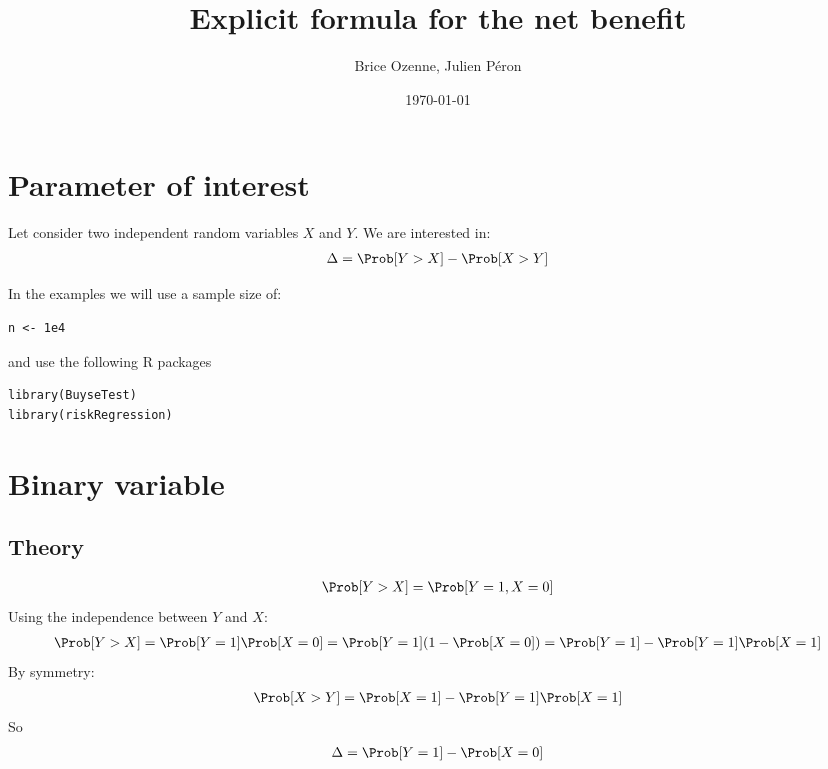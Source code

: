 \documentclass{article}
\author{Brice Ozenne, Julien Péron}
\date{\today}
\title{Explicit formula for the net benefit}
\begin{document}
\maketitle
\tableofcontents

\clearpage

\section{Parameter of interest}
\label{sec:org3ea6593}

Let consider two independent random variables \(X\) and \(Y\).
We are interested in:
\begin{align*}
\Delta = \Prob[Y>X] - \Prob[X>Y]
\end{align*}

\bigskip

In the examples we will use a sample size of:
\lstset{language=r,label= ,caption= ,captionpos=b,numbers=none}
\begin{lstlisting}
n <- 1e4
\end{lstlisting}
and use the following R packages
\lstset{language=r,label= ,caption= ,captionpos=b,numbers=none}
\begin{lstlisting}
library(BuyseTest)
library(riskRegression)
\end{lstlisting}

\clearpage

\section{Binary variable}
\label{sec:orgf6303b5}

\subsection{Theory}
\label{sec:org0f0fda7}
\begin{align*}
\Prob[Y>X] = \Prob[Y=1,X=0]
\end{align*}
Using the independence between \(Y\) and \(X\):
\begin{align*}
\Prob[Y>X] = \Prob[Y=1]\Prob[X=0] = \Prob[Y=1](1-\Prob[X=0]) = \Prob[Y=1] - \Prob[Y=1]\Prob[X=1]
\end{align*}
By symmetry:
\begin{align*}
\Prob[X>Y] = \Prob[X=1] - \Prob[Y=1]\Prob[X=1]
\end{align*}
So 
\begin{align*}
\Delta = \Prob[Y=1] - \Prob[X=0]
\end{align*}
\end{document}
